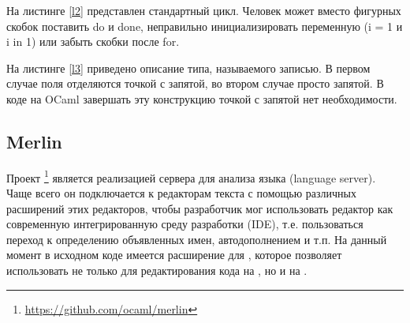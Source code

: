 \hfill


\begin{example}
	\begin{subexample}{0.5\textwidth}
		
		\caption{}
	\end{subexample}
	\begin{subexample}{0.5\textwidth}
		
		\caption{}
	\end{subexample}
\caption{}\label{l2}
\end{example}

На листинге \ref{l2} представлен стандартный цикл. Человек может вместо фигурных скобок поставить do и done, неправильно инициализировать переменную (i = 1 и i in 1) или забыть скобки после for.


\hfill


\begin{example}
	\begin{subexample}{0.5\textwidth}
		
		\caption{}
	\end{subexample}
	\begin{subexample}{0.5\textwidth}
		
		\caption{}
	\end{subexample}
\caption{}\label{l3}
\end{example}

На листинге \ref{l3} приведено описание типа, называемого записью. В первом случае поля отделяются точкой с запятой, во втором случае просто запятой. В коде на OCaml завершать эту конструкцию точкой с запятой нет необходимости.

\subsection{Merlin}

Проект \merlin{}\footnote{\url{https://github.com/ocaml/merlin}} является реализацией сервера для анализа языка \OCaml{} (language server). Чаще всего он подключается к редакторам текста с помощью различных расширений этих редакторов, чтобы разработчик мог использовать редактор как современную интегрированную среду разработки (IDE), т.е. пользоваться переход к определению объявленных имен, автодополнением и т.п. На данный момент в исходном коде \ReasonML{} имеется расширение для \merlin{}, которое позволяет использовать \merlin{} не только для редактирования кода на \OCaml{}, но и на \ReasonML{}.

